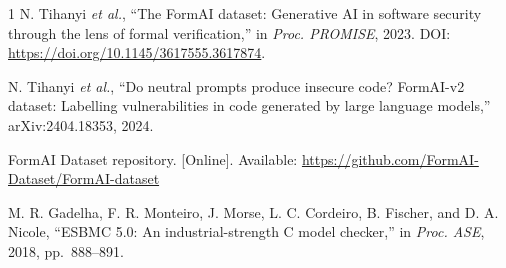 \documentclass[conference]{IEEEtran}
\begin{document}
\balance
\begin{thebibliography}{1}
N. Tihanyi \emph{et al.}, ``The FormAI dataset: Generative AI in software
security through the lens of formal verification,'' in \emph{Proc. PROMISE},
2023. DOI: \url{https://doi.org/10.1145/3617555.3617874}.

N. Tihanyi \emph{et al.}, ``Do neutral prompts produce insecure code? FormAI-v2
dataset: Labelling vulnerabilities in code generated by large language models,''
arXiv:2404.18353, 2024.

FormAI Dataset repository. [Online]. Available:
\url{https://github.com/FormAI-Dataset/FormAI-dataset}

M. R. Gadelha, F. R. Monteiro, J. Morse, L. C. Cordeiro, B. Fischer, and
D. A. Nicole, ``ESBMC 5.0: An industrial-strength C model checker,'' in
\emph{Proc. ASE}, 2018, pp.~888--891.
\end{thebibliography}
\end{document}
